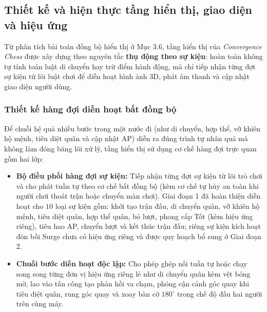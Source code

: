 \subsection{Thiết kế và hiện thực tầng hiển thị, giao diện và hiệu ứng}

Từ phân tích bài toán đồng bộ hiển thị ở Mục 3.6, tầng hiển thị của \textit{Convergence Chess} được xây dựng theo nguyên tắc \textbf{thụ động theo sự kiện}: hoàn toàn không tự tính toán luật di chuyển hay trừ điểm hành động, mà chỉ tiếp nhận từng đợt sự kiện từ lõi luật chơi để diễn hoạt hình ảnh 3D, phát âm thanh và cập nhật giao diện người dùng.

\subsubsection{Thiết kế hàng đợi diễn hoạt bất đồng bộ}
Để chuỗi hệ quả nhiều bước trong một nước đi (như di chuyển, hợp thể, vỡ khiên hộ mệnh, tiêu diệt quân và cập nhật AP) diễn ra đúng trình tự nhân quả mà không làm đóng băng lõi xử lý, tầng hiển thị sử dụng cơ chế hàng đợi trực quan gồm hai lớp:
\begin{itemize}
    \item \textbf{Bộ điều phối hàng đợi sự kiện:} Tiếp nhận từng đợt sự kiện từ lõi trò chơi và cho phát tuần tự theo cơ chế bất đồng bộ (kèm cơ chế tự hủy an toàn khi người chơi thoát trận hoặc chuyển màn chơi). Giai đoạn 1 đã hoàn thiện diễn hoạt cho $10$ loại sự kiện gồm: khởi tạo trận đấu, di chuyển quân, vỡ khiên hộ mệnh, tiêu diệt quân, hợp thể quân, bỏ lượt, phong cấp Tốt (kèm hiệu ứng riêng), tiêu hao AP, chuyển lượt và kết thúc trận đấu; riêng sự kiện kích hoạt đòn bồi Surge chưa có hiệu ứng riêng và được quy hoạch bổ sung ở Giai đoạn 2.
    \item \textbf{Chuỗi bước diễn hoạt độc lập:} Cho phép ghép nối tuần tự hoặc chạy song song từng đơn vị hiệu ứng riêng lẻ như di chuyển quân kèm vệt bóng mờ, lao vào tấn công tạo phản hồi va chạm, phóng cận cảnh góc quay khi tiêu diệt quân, rung góc quay và xoay bàn cờ $180^\circ$ trong chế độ đấu hai người trên cùng máy.
\end{itemize}

